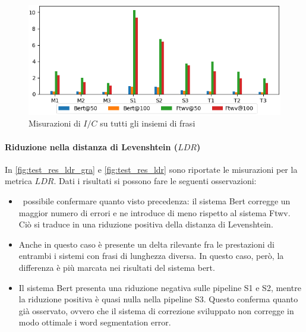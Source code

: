 \begin{figure}[H]
\centering
\includegraphics[width=\textwidth]{immagini/test/ic}
\caption{Misurazioni di $I/C$ su tutti gli insiemi di frasi}
\label{fig:test_res_ic}
\end{figure}


\paragraph{Riduzione nella distanza di Levenshtein ($LDR$)}
In \autoref{fig:test_res_ldr_gra} e \autoref{fig:test_res_ldr} sono riportate le misurazioni per la metrica $LDR$. Dati i risultati si possono fare le seguenti osservazioni:

\begin{itemize}
\item \E\ possibile confermare quanto visto precedenza: il sistema Bert corregge un maggior numero di errori e ne introduce di meno rispetto al sistema Ftwv. Ciò si traduce in una riduzione positiva della distanza di Levenshtein.
\item Anche in questo caso è presente un delta rilevante fra le prestazioni di entrambi i sistemi con frasi di lunghezza diversa. In questo caso, però, la differenza è più marcata nei risultati del sistema bert.

\item Il sistema Bert presenta una riduzione negativa sulle pipeline S1 e S2, mentre la riduzione positiva è quasi nulla nella pipeline S3. Questo conferma quanto già osservato, ovvero che il sistema di correzione sviluppato non corregge in modo ottimale i word segmentation error. 
\end{itemize}
\vfill
\newpage

